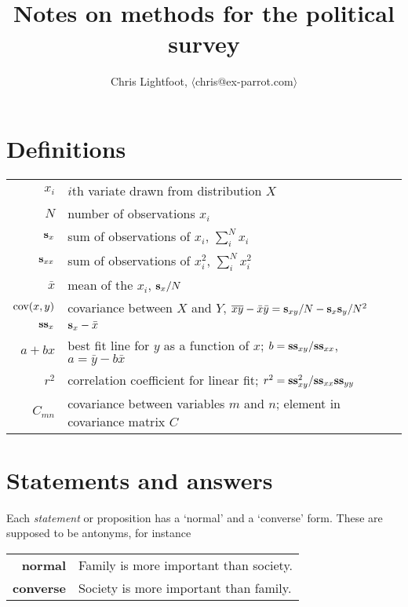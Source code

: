 \documentclass[a4paper,12pt]{article}
\title{Notes on methods for the political survey}
\author{Chris Lightfoot, $\langle$chris@ex-parrot.com$\rangle$}
\newcommand\cov{{\rm cov}}
\newcommand\s{{\bf s}}
\newcommand\Ss{{\bf ss}}
\begin{document}
\maketitle


\section{Definitions}

\begin{tabular}{rl}
$x_i$           &   $i$th variate drawn from distribution $X$           \\
$N$             &   number of observations $x_i$                        \\
$\s_x$          &   sum of observations of $x_i$, $\sum_i^N x_i$        \\
$\s_{xx}$       &   sum of observations of $x_i^2$, $\sum_i^N x_i^2$    \\
$\bar{x}$       &   mean of the $x_i$, $\s_x / N$                       \\
$\cov(x, y)$    &   covariance between $X$ and $Y$, 
                $\overline{xy}-\bar{x}\bar{y} = \s_{xy}/N - \s_x \s_y / N^2$\\
$\Ss_x$         &   $\s_x - \bar{x}$                                        \\
$a + b x$       &   best fit line for $y$ as a function of $x$;
                    $b = \Ss_{xy} / \Ss_{xx}$, $a = \bar{y} - b \bar{x}$    \\
$r^2$           &   correlation coefficient for linear fit;
                    $r^2 = \Ss_{xy}^2 / \Ss_{xx} \Ss_{yy}$                  \\
$C_{mn}$        &   covariance between variables $m$ and $n$; element in
                    covariance matrix $C$
\end{tabular}


\section{Statements and answers}

Each {\em statement} or proposition has a `normal' and a `converse' form. These
are supposed to be antonyms, for instance

\begin{tabular}{rl}
{\bf normal }   & Family is more important than society.        \\
{\bf converse } & Society is more important than family.        \\
\end{tabular}
\end{document}
